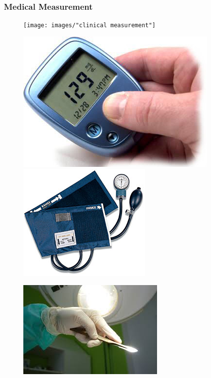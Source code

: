 \documentclass[compress]{beamer}        %
\begin{document}
		\begin{frame}
			\frametitle{Medical Measurement}
			\begin{figure}
				\centering
				\texttt{[image: images/"clinical measurement"]}
			\end{figure}
			\begin{figure}
				\centering
				\includegraphics[width=0.35\linewidth]{images/diabetes}
				\includegraphics[width=0.35\linewidth]{images/bpcuff}
			\end{figure}
			
		\end{frame}
		\begin{frame}
			
			\begin{figure}
				\centering
				\includegraphics[width=0.7\linewidth]{images/invasiveprocedures}
			\end{figure}
			
		\end{frame}
		
\end{document}
